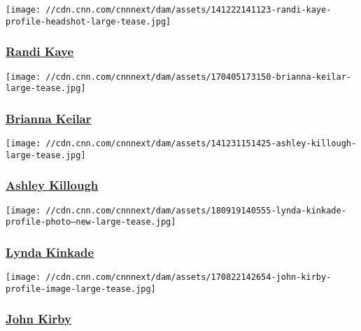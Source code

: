 \href{/profiles/randi-kaye-profile}{}

\texttt{[image: //cdn.cnn.com/cnnnext/dam/assets/141222141123-randi-kaye-profile-headshot-large-tease.jpg]}

\hypertarget{randi-kaye}{%
\subsubsection{\texorpdfstring{\href{/profiles/randi-kaye-profile}{Randi
Kaye}}{Randi Kaye}}\label{randi-kaye}}

\href{/profiles/brianna-keilar-profile}{}

\texttt{[image: //cdn.cnn.com/cnnnext/dam/assets/170405173150-brianna-keilar-large-tease.jpg]}

\hypertarget{brianna-keilar}{%
\subsubsection{\texorpdfstring{\href{/profiles/brianna-keilar-profile}{Brianna
Keilar}}{Brianna Keilar}}\label{brianna-keilar}}

\href{/profiles/ashley-killough}{}

\texttt{[image: //cdn.cnn.com/cnnnext/dam/assets/141231151425-ashley-killough-large-tease.jpg]}

\hypertarget{ashley-killough}{%
\subsubsection{\texorpdfstring{\href{/profiles/ashley-killough}{Ashley
Killough}}{Ashley Killough}}\label{ashley-killough}}

\href{/profiles/lynda-kinkade-profile}{}

\texttt{[image: //cdn.cnn.com/cnnnext/dam/assets/180919140555-lynda-kinkade-profile-photo---new-large-tease.jpg]}

\hypertarget{lynda-kinkade}{%
\subsubsection{\texorpdfstring{\href{/profiles/lynda-kinkade-profile}{Lynda
Kinkade}}{Lynda Kinkade}}\label{lynda-kinkade}}

\href{/profiles/john-kirby-profile}{}

\texttt{[image: //cdn.cnn.com/cnnnext/dam/assets/170822142654-john-kirby-profile-image-large-tease.jpg]}

\hypertarget{john-kirby}{%
\subsubsection{\texorpdfstring{\href{/profiles/john-kirby-profile}{John
Kirby}}{John Kirby}}\label{john-kirby}}

